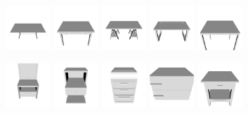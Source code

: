 \begin{figure}[!t]
	\includegraphics[width=0.15\textwidth]{Figures/ObjRecog/table_0}\hfill
	\includegraphics[width=0.15\textwidth]{Figures/ObjRecog/table_1}\hfill
	\includegraphics[width=0.15\textwidth]{Figures/ObjRecog/table_2}\hfill
	\includegraphics[width=0.15\textwidth]{Figures/ObjRecog/table_3}\hfill
	\includegraphics[width=0.15\textwidth]{Figures/ObjRecog/table_4}\hfill

	\includegraphics[width=0.15\textwidth]{Figures/ObjRecog/nstand_0}\hfill
	\includegraphics[width=0.15\textwidth]{Figures/ObjRecog/nstand_1}\hfill
	\includegraphics[width=0.15\textwidth]{Figures/ObjRecog/nstand_2}\hfill
	\includegraphics[width=0.15\textwidth]{Figures/ObjRecog/nstand_3}\hfill
	\includegraphics[width=0.15\textwidth]{Figures/ObjRecog/nstand_4}\hfill


\end{figure}

